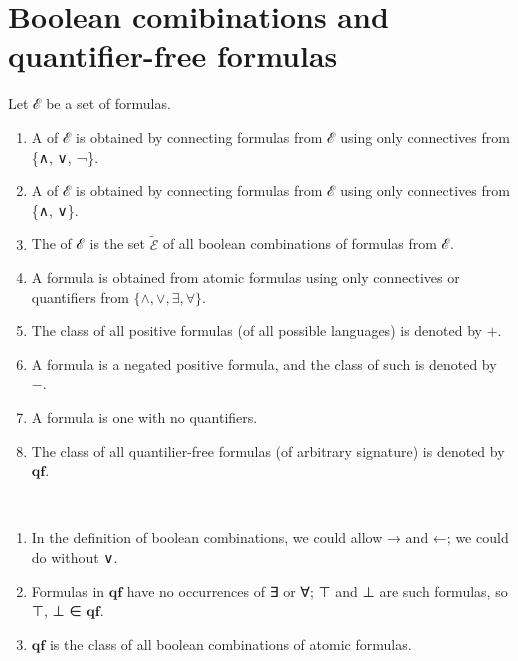 \documentclass[a4paper,UKenglish,cleveref,autoref,thm-restate,12pt]{lipics-v2021-wjd}
\newcommand{\<}{\langle}
\renewcommand{\>}{\rangle}
\begin{document}

\section{Boolean comibinations and quantifier-free formulas}\label{boolean-comibinations-and-quantifier-free-formulas}

Let ℰ be a set of formulas.

\begin{enumerate}
\item
  A  of ℰ is obtained by connecting formulas from ℰ
  using only connectives from \{∧, ∨, ¬\}.
\item
  A  of ℰ is obtained by connecting formulas
  from ℰ using only connectives from \{∧, ∨\}.
\item
  The  of ℰ is the set \(\tilde{ℰ}\) of all boolean combinations of
  formulas from ℰ.
\item
  A  formula is obtained from atomic formulas using
  only connectives or quantifiers from \(\{∧, ∨, ∃, ∀\}\).
\item The class of all positive formulas (of all possible languages) is denoted by \(\boldsymbol{+}\).
\item A  formula is a negated positive formula, and the class
  of such is denoted by \(\boldsymbol{-}\).
\item A  formula is one with no quantifiers.
\item The class of all quantilier-free formulas (of arbitrary signature) is
  denoted by \(\mathbf{qf}\).
\end{enumerate}
\begin{remarks*}\
\begin{enumerate}
\item In the definition of boolean combinations, we could allow → and ←; we
  could do without ∨.
\item Formulas in \(\mathbf{qf}\) have no occurrences of ∃ or ∀; ⊤ and ⊥ are
  such formulas, so ⊤, ⊥ ∈ \(\mathbf{qf}\).
\item \(\mathbf{qf}\) is the class of all boolean combinations of atomic formulas.
\end{enumerate}
\end{remarks*}
\end{document}
